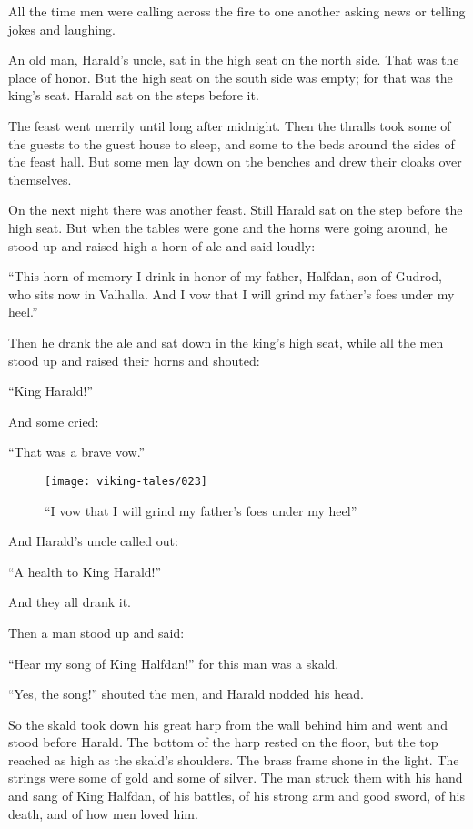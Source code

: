 All the time men were calling across the fire to one another asking news
or telling jokes and laughing.

An old man, Harald's uncle, sat in the high seat on the north side. That
was the place of honor. But the high seat on the south side was empty;
for that was the king's seat. Harald sat on the steps before it.

The feast went merrily until long after midnight. Then the thralls took
some of the guests to the guest house to sleep, and some to the beds
around the sides of the feast hall. But some men lay down on the benches
and drew their cloaks over themselves.

On the next night there was another feast. Still Harald sat on the step
before the high seat. But when the tables were gone and the horns were
going around, he stood up and raised high a horn of ale and said loudly:

``This horn of memory I drink in honor of my father, Halfdan, son of
Gudrod, who sits now in Valhalla. And I vow that I will grind my
father's foes under my heel.''

Then he drank the ale and sat down in the king's high seat, while all
the men stood up and raised their horns and shouted:

``King Harald!''

And some cried:

``That was a brave vow.''

\begin{figure}
    \centering
    \texttt{[image: viking-tales/023]}
    \caption{``I vow that I will grind my father's foes under my heel''}
\end{figure}

And Harald's uncle called out:

``A health to King Harald!''

And they all drank it.

Then a man stood up and said:

``Hear my song of King Halfdan!'' for this man was a skald.

``Yes, the song!'' shouted the men, and Harald nodded his head.

So the skald took down his great harp from the wall behind him and went
and stood before Harald. The bottom of the harp rested on the floor, but
the top reached as high as the skald's shoulders. The brass frame shone
in the light. The strings were some of gold and some of silver. The man
struck them with his hand and sang of King Halfdan, of his battles, of
his strong arm and good sword, of his death, and of how men loved him.

